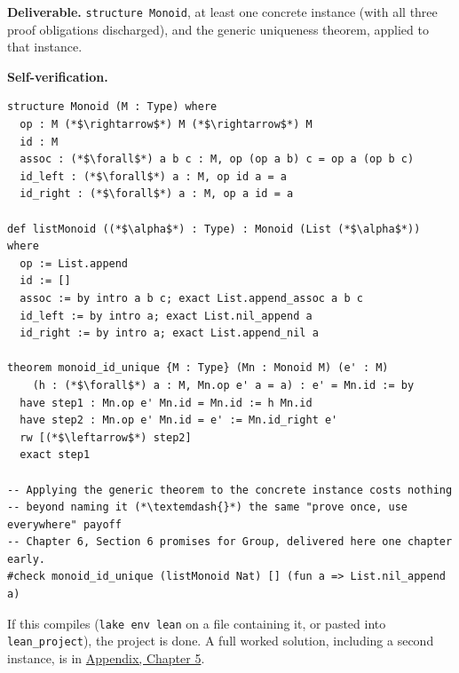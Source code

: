 \begin{pblproject}
\textbf{Deliverable.} \texttt{structure Monoid}, at least one concrete instance (with all three proof obligations discharged), and the generic uniqueness theorem, applied to that instance.

\textbf{Self-verification.}

\begin{lstlisting}
structure Monoid (M : Type) where
  op : M (*$\rightarrow$*) M (*$\rightarrow$*) M
  id : M
  assoc : (*$\forall$*) a b c : M, op (op a b) c = op a (op b c)
  id_left : (*$\forall$*) a : M, op id a = a
  id_right : (*$\forall$*) a : M, op a id = a

def listMonoid ((*$\alpha$*) : Type) : Monoid (List (*$\alpha$*)) where
  op := List.append
  id := []
  assoc := by intro a b c; exact List.append_assoc a b c
  id_left := by intro a; exact List.nil_append a
  id_right := by intro a; exact List.append_nil a

theorem monoid_id_unique {M : Type} (Mn : Monoid M) (e' : M)
    (h : (*$\forall$*) a : M, Mn.op e' a = a) : e' = Mn.id := by
  have step1 : Mn.op e' Mn.id = Mn.id := h Mn.id
  have step2 : Mn.op e' Mn.id = e' := Mn.id_right e'
  rw [(*$\leftarrow$*) step2]
  exact step1

-- Applying the generic theorem to the concrete instance costs nothing
-- beyond naming it (*\textemdash{}*) the same "prove once, use everywhere" payoff
-- Chapter 6, Section 6 promises for Group, delivered here one chapter early.
#check monoid_id_unique (listMonoid Nat) [] (fun a => List.nil_append a)
\end{lstlisting}

If this compiles (\texttt{lake env lean} on a file containing it, or pasted into \texttt{lean\_\allowbreak{}project}), the project is done. A full worked solution, including a second instance, is in \hyperref[sec:14-appendix-solutions:04-chapter-5:1]{Appendix, Chapter 5}.

\end{pblproject}
